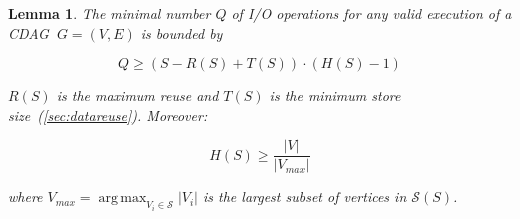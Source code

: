 \documentclass[sigplan,review,anonymous]{acmart}\settopmatter{printfolios=true,printccs=false,printacmref=false}
\newcommand\mac[1]{\textcolor{red}{[Mac: #1]}}
\DeclareMathOperator*{\argmax}{arg\,max}
\newtheorem{lma}{Lemma}
\begin{document}
\begin{lma}
	\label{lma:reuse}
	The minimal number $Q$ of I/O operations for any valid execution of a CDAG 
	$\ G=(V,E)$ is bounded by  
	
	\vspace{-0.5em}
	\begin{equation}
	Q \ge (S - R(S) + T(S)) \cdot (H(S) - 1)
	\label{eq:reusebound} \end{equation}
	\vspace{-0.5em}
	
	\noindent
	$R(S)$ is the maximum reuse and $T(S)$ is the minimum store 
	size~(\cref{sec:datareuse}).
	Moreover: 
	
	\vspace{-0.5em}
	\begin{equation}\label{eq:reusebound-pmax}
	H(S) \ge \frac{|V|}{|V_{max}|}
	\end{equation}
	\vspace{-0.5em}
	
	\noindent
	where $V_{max} = \argmax_{V_i \in \mathcal{S}}|V_i|$ is 
	the largest
	subset of vertices in $\mathcal{S}(S)$.
	
\end{lma}
\end{document}
